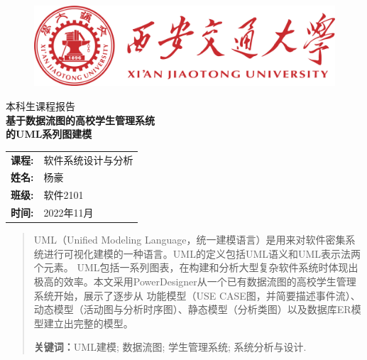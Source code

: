 \documentclass[12pt, a4paper, oneside]{ctexart}
\begin{document}
\thispagestyle{empty}

\begin{figure}[t]
    \centering
    \includegraphics[width=13cm]{../pic/xjtu.png}
\end{figure}

\vspace*{\fill}
    \begin{center}
        \centering
        \vspace{-3cm}
        \fangsong\huge{本科生课程报告} \\\kaishu \Huge{\textbf{基于数据流图的高校学生管理系统\\的UML系列图建模}}
    \end{center}
\vspace*{\fill}

\begin{table}[b]
    \centering
    \large
    \begin{tabular}{ll}
        \textbf{课程:} & 软件系统设计与分析 \\
        \textbf{姓名:} & 杨豪 \\
        \textbf{班级:} & 软件2101 \\
        \textbf{时间:} & 2022年11月 \\
    \end{tabular}
\end{table}

\newpage

\thispagestyle{empty}
\begin{abstract}
    UML（Unified Modeling Language，统一建模语言）是用来对软件密集系统进行可视化建模的一种语言。UML的定义包括UML语义和UML表示法两个元素。
    UML包括一系列图表，在构建和分析大型复杂软件系统时体现出极高的效率。本文采用PowerDesigner从一个已有数据流图的高校学生管理系统开始，展示了逐步从
    功能模型（USE CASE图，并简要描述事件流）、动态模型（活动图与分析时序图）、静态模型（分析类图）以及数据库ER模型建立出完整的模型。
    \par\textbf{关键词：}UML建模; 数据流图; 学生管理系统; 系统分析与设计.
\end{abstract}

\newpage
{}
\setcounter{page}{1}
\thispagestyle{plain}
\tableofcontents
\newpage
\setcounter{page}{1}
\end{document}
